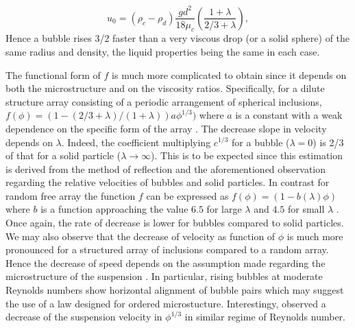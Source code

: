 

\begin{equation}
    u_0
    = (\rho_c - \rho_d)\frac{g d^2}{18\mu_c}\left(\frac{1+\lambda}{2/3 + \lambda}\right),
\end{equation}
Hence a bubble rises 3/2 faster than a very viscous drop (or a solid sphere) of the same radius and density, the liquid properties being the same in each case.

The functional form of $f$ is much more complicated to obtain since it depends on both the microstructure and on the viscosity ratios. Specifically, for a dilute structure array consisting of a periodic arrangement of spherical inclusions, $f(\phi) =(1 - (2/3+\lambda)/(1+\lambda))a\phi^{1/3})$ where $a$ is a constant with a weak dependence on the specific form of the array \citep{sangani1987}. The decrease slope in velocity depends on $\lambda$. Indeed, the coefficient multiplying $c^{1/3}$ for a bubble ($\lambda=0$) is 2/3 of that for a solid particle ($\lambda \to \infty$). This is to be expected since this estimation is derived from the method of reflection and the aforementioned observation regarding the relative velocities of bubbles and solid particles. In contrast for random free array the function $f$ can be expressed as  $f(\phi) = (1-b(\lambda)\phi)$ where $b$ is a function approaching the value $6.5$ for large $\lambda$ and $4.5$ for small $\lambda$ \citep{wacholder1973,haber1981}. Once again, the rate of decrease is lower for bubbles compared to solid particles. We may also observe that the decrease of velocity as function of $\phi$ is much more pronounced for a structured array of inclusions compared to a random array. Hence the decrease of speed depends on the assumption made regarding the microstructure of the suspension \citep{davis1985}. In particular, rising bubbles at moderate Reynolds numbers show horizontal alignment of bubble pairs \citep{bunner2002,yin2006} which may suggest the use of a law designed for ordered microstucture. Interestingy, \citet{loisy2017} observed a decrease of the suspension velocity in $\phi^{1/3}$ in similar regime of Reynolds number. 


